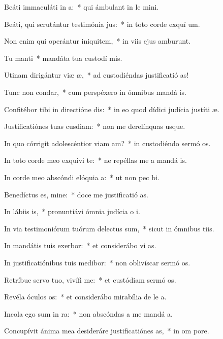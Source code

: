 \item Beáti immaculáti in a:~* qui ámbulant in le mini.
\item Beáti, qui scrutántur testimónia jus:~* in toto corde exquí um.
\item Non enim qui operántur iniquitem,~* in viis ejus amburunt.
\item Tu manti~* mandáta tua custodí mis.
\item Utinam dirigántur viæ æ,~* ad custodiéndas justificatió as!
\item Tunc non condar,~* cum perspéxero in ómnibus mandá is.
\item Confitébor tibi in directióne dis:~* in eo quod dídici judícia justíti æ.
\item Justificatiónes tuas cusdiam:~* non me derelínquas usque.
\item In quo córrigit adolescéntior viam am?~* in custodiéndo sermó os.
\item In toto corde meo exquivi te:~* ne repéllas me a mandá is.
\item In corde meo abscóndi elóquia a:~* ut non pec bi.
\item Benedíctus es, mine:~* doce me justificatió as.
\item In lábiis is,~* pronuntiávi ómnia judícia o i.
\item In via testimoniórum tuórum delectus sum,~* sicut in ómnibus tiis.
\item In mandátis tuis exerbor:~* et considerábo vi as.
\item In justificatiónibus tuis medibor:~* non oblivíscar sermó os.
\item Retríbue servo tuo, vivífi me:~* et custódiam sermó os.
\item Revéla óculos os:~* et considerábo mirabília de le a.
\item Incola ego sum in ra:~* non abscóndas a me mandá a.
\item Concupívit ánima mea desideráre justificatiónes as,~* in om pore.

